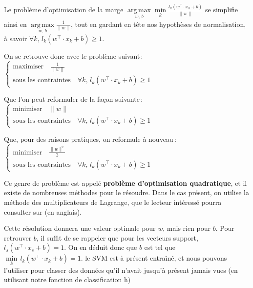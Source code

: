 \documentclass{article}
\begin{document}
Le problème d’optimisation de la marge $\displaystyle\mathop{\operatorname{arg\,max}}\limits_{w,\,b}\min\limits_k \frac{l_k (w^\top \cdot x_k+b)}{\|w\|}$ se simplifie ainsi en $\displaystyle\mathop{\operatorname{arg\,max}}\limits_{w,\,b} \frac{1}{\|w\|}$, tout en gardant en tête nos hypothèses de normalisation, à savoir $\forall k, \, l_k (w^\top \cdot x_k+b) \geq 1$.



On se retrouve donc avec le problème suivant :
$\begin{cases}
\text{maximiser} \quad \frac{1}{\|w\|}\\ 
\text{sous les contraintes}\quad \forall k, \, l_k (w^\top \cdot x_k+b)\geq 1
\end{cases}$



Que l’on peut reformuler de la façon suivante :
$\begin{cases}
\text{minimiser} \quad\|w\|\\ 
\text{sous les contraintes}\quad \forall k, \, l_k (w^\top \cdot x_k+b)\geq 1
\end{cases}$



Que, pour des raisons pratiques, on reformule à nouveau :
$\begin{cases}
\text{minimiser} \quad\frac{\|w\|^2}{2}\\ 
\text{sous les contraintes}\quad \forall k, \, l_k (w^\top \cdot x_k+b)\geq 1
\end{cases}$



Ce genre de problème est appelé \textbf{problème d’optimisation quadratique}, et il existe de nombreuses méthodes pour le résoudre. Dans le cas présent, on utilise la méthode des multiplicateurs de Lagrange, que le lecteur intéressé pourra consulter sur  (en anglais).



Cette résolution donnera une valeur optimale pour $w$, mais rien pour $b$. Pour retrouver $b$, il suffit de se rappeler que pour les vecteurs support, $l_s (w^ \top \cdot x_s+b)=1$. On en déduit donc que $b$ est tel que $\min\limits_k\, l_k (w^\top \cdot x_k  +b) =1$.
\vspace{5mm} %
le SVM est à présent entraîné, et nous pouvons l’utiliser pour classer des données qu’il n’avait jusqu’à présent jamais vues (en utilisant notre fonction de classification h)
\vspace{5mm} %
\end{document}
